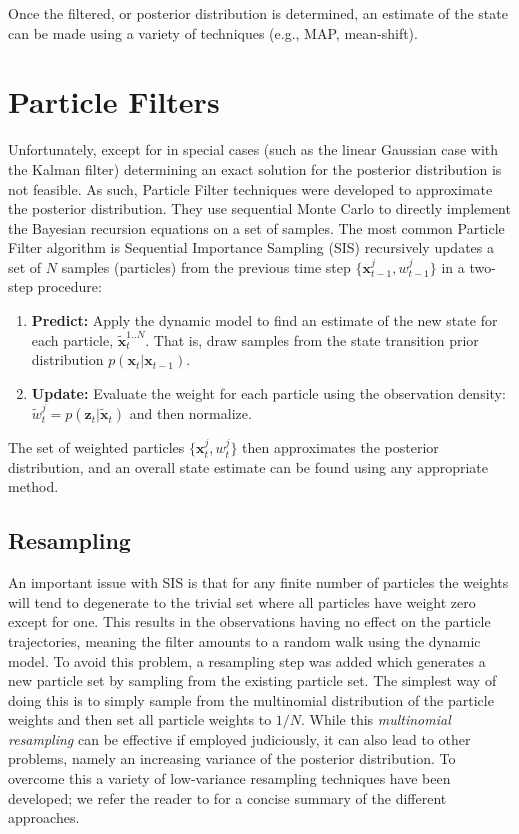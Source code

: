 Once the filtered, or posterior distribution is determined, an estimate of the state can be made using a variety of techniques (e.g., MAP, mean-shift). 

\section{Particle Filters}
Unfortunately, except for in special cases (such as the linear Gaussian case with the Kalman filter) determining an exact solution for the posterior distribution is not feasible. As such, Particle Filter techniques were developed to approximate the posterior distribution. They use sequential Monte Carlo to directly implement the Bayesian recursion equations on a set of samples. The most common Particle Filter algorithm is Sequential Importance Sampling (SIS) recursively updates a set of $N$ samples (particles) from the previous time step $\{ \mathbf{x}^{j}_{t-1}, w^j_{t-1} \}$ in a two-step procedure: 

\begin{enumerate}
 \item \textbf{Predict:} Apply the dynamic model to find an estimate of the new state for each particle, $\tilde{\mathbf{x}}^{1..N}_t$. That is, draw samples from the state transition prior distribution $\mathit{p}(\mathbf{x}_t|\mathbf{x}_{t-1})$.
 \item \textbf{Update:} Evaluate the weight for each particle using the observation density:  $\tilde{w}^j_t = \mathit{p}(\mathbf{z}_t|\tilde{\mathbf{x}}_{t})$ and then normalize.
\end{enumerate}

The set of weighted particles $\{ \mathbf{x}^{j}_{t}, w^j_{t} \}$ then approximates the posterior distribution, and an overall state estimate can be found using any appropriate method.

\subsection{Resampling}
An important issue with SIS is that for any finite number of particles the weights will tend to degenerate to the trivial set where all particles have weight zero except for one. This results in the observations having no effect on the particle trajectories, meaning the filter amounts to a random walk using the dynamic model. To avoid this problem, a resampling step was added \cite{GordonEtAlPf, Rubin:SIR} which generates a new particle set by sampling from the existing particle set. The simplest way of doing this is to simply sample from the multinomial distribution of the particle weights and then set all particle weights to $1/N$. While this \textit{multinomial resampling} can be effective if employed judiciously, it can also lead to other problems, namely an increasing variance of the posterior distribution. To overcome this a variety of low-variance resampling techniques have been developed; we refer the reader to \cite{Douce:Resampling} for a concise summary of the different approaches.


